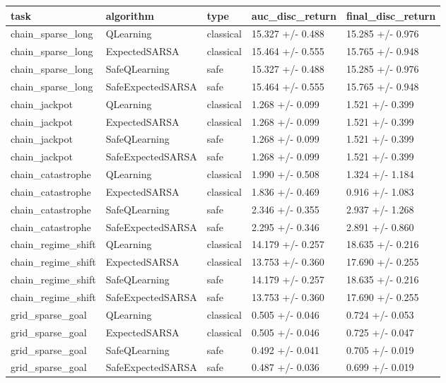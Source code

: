 \begin{tabular}{lllll}
\toprule
task & algorithm & type & auc_disc_return & final_disc_return \\
\midrule
chain_sparse_long & QLearning & classical & 15.327 +/- 0.488 & 15.285 +/- 0.976 \\
chain_sparse_long & ExpectedSARSA & classical & 15.464 +/- 0.555 & 15.765 +/- 0.948 \\
chain_sparse_long & SafeQLearning & safe & 15.327 +/- 0.488 & 15.285 +/- 0.976 \\
chain_sparse_long & SafeExpectedSARSA & safe & 15.464 +/- 0.555 & 15.765 +/- 0.948 \\
chain_jackpot & QLearning & classical & 1.268 +/- 0.099 & 1.521 +/- 0.399 \\
chain_jackpot & ExpectedSARSA & classical & 1.268 +/- 0.099 & 1.521 +/- 0.399 \\
chain_jackpot & SafeQLearning & safe & 1.268 +/- 0.099 & 1.521 +/- 0.399 \\
chain_jackpot & SafeExpectedSARSA & safe & 1.268 +/- 0.099 & 1.521 +/- 0.399 \\
chain_catastrophe & QLearning & classical & 1.990 +/- 0.508 & 1.324 +/- 1.184 \\
chain_catastrophe & ExpectedSARSA & classical & 1.836 +/- 0.469 & 0.916 +/- 1.083 \\
chain_catastrophe & SafeQLearning & safe & 2.346 +/- 0.355 & 2.937 +/- 1.268 \\
chain_catastrophe & SafeExpectedSARSA & safe & 2.295 +/- 0.346 & 2.891 +/- 0.860 \\
chain_regime_shift & QLearning & classical & 14.179 +/- 0.257 & 18.635 +/- 0.216 \\
chain_regime_shift & ExpectedSARSA & classical & 13.753 +/- 0.360 & 17.690 +/- 0.255 \\
chain_regime_shift & SafeQLearning & safe & 14.179 +/- 0.257 & 18.635 +/- 0.216 \\
chain_regime_shift & SafeExpectedSARSA & safe & 13.753 +/- 0.360 & 17.690 +/- 0.255 \\
grid_sparse_goal & QLearning & classical & 0.505 +/- 0.046 & 0.724 +/- 0.053 \\
grid_sparse_goal & ExpectedSARSA & classical & 0.505 +/- 0.046 & 0.725 +/- 0.047 \\
grid_sparse_goal & SafeQLearning & safe & 0.492 +/- 0.041 & 0.705 +/- 0.019 \\
grid_sparse_goal & SafeExpectedSARSA & safe & 0.487 +/- 0.036 & 0.699 +/- 0.019 \\

\end{tabular}
